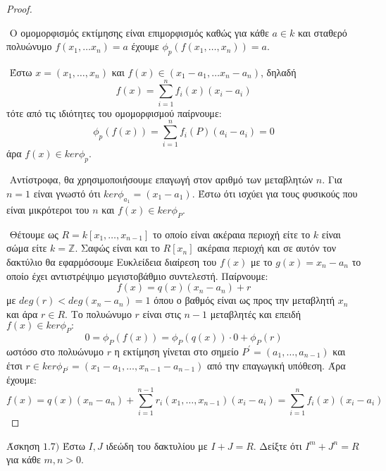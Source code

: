 \documentclass[oneside,a4paper]{article}
\newcommand{\Z}{\mathbb{Z}}
\begin{document}
\begin{proof} $ $

	$ $\newline
	Ο ομομορφισμός εκτίμησης είναι επιμορφισμός καθώς για κάθε $a\in k$ και σταθερό πολυώνυμο $f(x_1, \ldots x_n) = a$ έχουμε $\phi_p (f(x_1,\ldots,x_n)) = a$.

	$ $\newline
	Έστω $x= (x_1, \ldots , x_n)$ και $f(x) \in (x_1-a_1,\ldots x_n-a_n)$, δηλαδή
	$$f(x) = \sum\limits_{i=1}^{n} f_i(x)(x_i-a_i)$$
	τότε από τις ιδιότητες του ομομορφισμού παίρνουμε:
	$$\phi_p (f(x)) = \sum\limits_{i=1}^n f_i (P) (a_i - a_i) = 0$$
	άρα $f(x) \in ker\phi_p$.

	$ $\newline
	Αντίστροφα, θα χρησιμοποιήσουμε επαγωγή στον αριθμό των μεταβλητών $n$. Για $n=1$ είναι γνωστό ότι $ker\phi_{a_1} = (x_1 - a_1)$. Έστω ότι ισχύει για τους φυσικούς που είναι μικρότεροι του $n$ και $f(x) \in ker\phi_P$.
	
	$ $\newline
	Θέτουμε ως $R = k[x_1,\ldots, x_{n-1}]$ το οποίο είναι ακέραια περιοχή είτε το $k$ είναι σώμα είτε $k=\Z$. Σαφώς είναι και το $R[x_n]$ ακέραια περιοχή και σε αυτόν τον δακτύλιο θα εφαρμόσουμε Ευκλείδεια διαίρεση του $f(x)$ με το $g(x) = x_n - a_n$ το οποίο έχει αντιστρέψιμο μεγιστοβάθμιο συντελεστή. Παίρνουμε:
	$$f(x) = q(x)(x_n - a_n) + r$$ 
	με $deg(r) < deg(x_n - a_n)=1$ όπου ο βαθμός είναι ως προς την μεταβλητή $x_n$ και άρα $r \in R$. Το πολυώνυμο $r$ είναι στις $n-1$ μεταβλητές και επειδή $f(x) \in ker\phi_P:$
	$$0 = \phi_P(f(x)) = \phi_P (q(x))\cdot 0 + \phi_P (r) $$
	ωστόσο στο πολυώνυμο $r$ η εκτίμηση γίνεται στο σημείο $P^{\prime} = (a_1, \ldots, a_{n-1})$ και έτσι $r \in ker\phi_{P^{\prime}} = (x_1 - a_1,\ldots, x_{n-1} - a_{n-1})$ από την επαγωγική υπόθεση.
	Άρα έχουμε:
	$$f(x) = q(x)(x_n - a_n) + \sum\limits_{i=1}^{n-1} r_i (x_1,\ldots, x_{n-1}) (x_i - a_i) = \sum\limits_{i=1}^n f_i (x) (x_i - a_i)$$
\end{proof}
\pagebreak

\noindent Άσκηση $1.7)$
\quad Έστω  $I,J$ ιδεώδη του δακτυλίου   με  $I+J=R$.  Δείξτε ότι $I^m+J^n=R$  για κάθε $m, n>0$.
\end{document}
